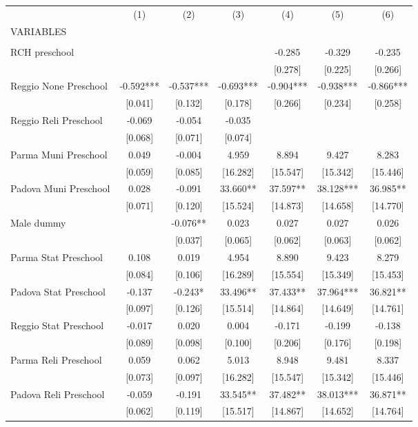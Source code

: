 \begin{tabular}{lcccccc} \hline
 & (1) & (2) & (3) & (4) & (5) & (6) \\
VARIABLES &  &  &  &  &  &  \\ \hline
 &  &  &  &  &  &  \\
RCH preschool &  &  &  & -0.285 & -0.329 & -0.235 \\
 &  &  &  & [0.278] & [0.225] & [0.266] \\
Reggio None Preschool & -0.592*** & -0.537*** & -0.693*** & -0.904*** & -0.938*** & -0.866*** \\
 & [0.041] & [0.132] & [0.178] & [0.266] & [0.234] & [0.258] \\
Reggio Reli Preschool & -0.069 & -0.054 & -0.035 &  &  &  \\
 & [0.068] & [0.071] & [0.074] &  &  &  \\
Parma Muni Preschool & 0.049 & -0.004 & 4.959 & 8.894 & 9.427 & 8.283 \\
 & [0.059] & [0.085] & [16.282] & [15.547] & [15.342] & [15.446] \\
Padova Muni Preschool & 0.028 & -0.091 & 33.660** & 37.597** & 38.128*** & 36.985** \\
 & [0.071] & [0.120] & [15.524] & [14.873] & [14.658] & [14.770] \\
Male dummy &  & -0.076** & 0.023 & 0.027 & 0.027 & 0.026 \\
 &  & [0.037] & [0.065] & [0.062] & [0.063] & [0.062] \\
Parma Stat Preschool & 0.108 & 0.019 & 4.954 & 8.890 & 9.423 & 8.279 \\
 & [0.084] & [0.106] & [16.289] & [15.554] & [15.349] & [15.453] \\
Padova Stat Preschool & -0.137 & -0.243* & 33.496** & 37.433** & 37.964*** & 36.821** \\
 & [0.097] & [0.126] & [15.514] & [14.864] & [14.649] & [14.761] \\
Reggio Stat Preschool & -0.017 & 0.020 & 0.004 & -0.171 & -0.199 & -0.138 \\
 & [0.089] & [0.098] & [0.100] & [0.206] & [0.176] & [0.198] \\
Parma Reli Preschool & 0.059 & 0.062 & 5.013 & 8.948 & 9.481 & 8.337 \\
 & [0.073] & [0.097] & [16.282] & [15.547] & [15.342] & [15.446] \\
Padova Reli Preschool & -0.059 & -0.191 & 33.545** & 37.482** & 38.013*** & 36.871** \\
 & [0.062] & [0.119] & [15.517] & [14.867] & [14.652] & [14.764] \\

\end{tabular}
